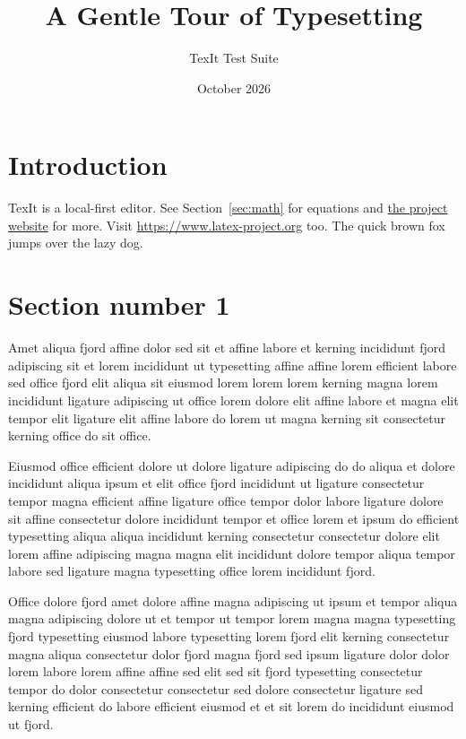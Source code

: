 \documentclass[11pt]{article}
\title{A Gentle Tour of Typesetting}
\author{TexIt Test Suite}
\date{October 2026}
\begin{document}
\maketitle
\tableofcontents

\section{Introduction}\label{sec:intro}
TexIt is a local-first editor. See Section~\ref{sec:math} for equations and \href{https://example.com/texit}{the project website} for more.
Visit \url{https://www.latex-project.org} too. The quick brown fox jumps over the lazy dog.

\section{Section number 1}\label{sec:s1}
Amet aliqua fjord affine dolor sed sit et affine labore et kerning incididunt fjord adipiscing sit et lorem incididunt ut typesetting affine affine lorem efficient labore sed office fjord elit aliqua sit eiusmod lorem lorem lorem kerning magna lorem incididunt ligature adipiscing ut office lorem dolore elit affine labore et magna elit tempor elit ligature elit affine labore do lorem ut magna kerning sit consectetur kerning office do sit office.

Eiusmod office efficient dolore ut dolore ligature adipiscing do do aliqua et dolore incididunt aliqua ipsum et elit office fjord incididunt ut ligature consectetur tempor magna efficient affine ligature office tempor dolor labore ligature dolore sit affine consectetur dolore incididunt tempor et office lorem et ipsum do efficient typesetting aliqua aliqua incididunt kerning consectetur consectetur dolore elit lorem affine adipiscing magna magna elit incididunt dolore tempor aliqua tempor labore sed ligature magna typesetting office lorem incididunt fjord.

Office dolore fjord amet dolore affine magna adipiscing ut ipsum et tempor aliqua magna adipiscing dolore ut et tempor ut tempor lorem magna magna typesetting fjord typesetting eiusmod labore typesetting lorem fjord elit kerning consectetur magna aliqua consectetur dolor fjord magna fjord sed ipsum ligature dolor dolor lorem labore lorem affine affine sed elit sed sit fjord typesetting consectetur tempor do dolor consectetur consectetur sed dolore consectetur ligature sed kerning efficient do labore efficient eiusmod et et sit lorem do incididunt eiusmod ut fjord.
\end{document}

